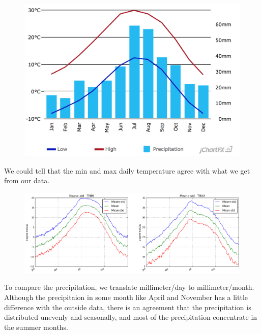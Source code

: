 \documentclass{article}
\begin{document}
\begin{figure}[H]
\centering
\includegraphics[width=12cm]{../figures/1_1_outside_source}
\end{figure}

We could tell that the min and max daily temperature agree with what we get from our data.

\begin{figure}[H]
\centering
\includegraphics[width=15cm]{../figures/1_2_min_max_temperature}
\end{figure}

To compare the precipitation, we translate millimeter/day to millimeter/month. Although the precipitaion in some month like April and November has a little difference with the outside data, there is an agreement that the precipitation is distributed unevenly and seasonally, and most of the precipitation concentrate in the summer months.
\end{document}
